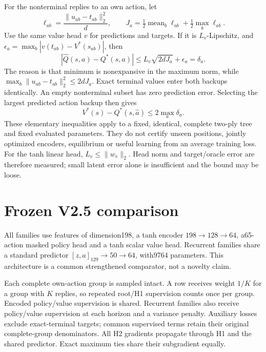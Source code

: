 \documentclass[11pt,a4paper]{article}
\begin{document}
For the nonterminal replies to an own action, let
\[
 \ell_{ab}=\frac{\|u_{ab}-t_{ab}\|_2^2}{d},\qquad
 J_a=\tfrac12\operatorname{mean}_b\ell_{ab}
       +\tfrac12\max_b\ell_{ab}.
\]
Use the same value head $v$ for predictions and targets. If it is
$L_v$-Lipschitz, and
$\epsilon_a=\max_b|v(t_{ab})-V^*(s_{ab})|$, then
\[
 |\widehat Q(s,a)-Q^*(s,a)|
 \le L_v\sqrt{2dJ_a}+\epsilon_a=\delta_a.
\]
The reason is that minimum is nonexpansive in the maximum norm, while
$\max_b\|u_{ab}-t_{ab}\|_2^2\le2dJ_a$. Exact terminal values enter both
backups identically. An empty nonterminal subset has zero prediction error.
Selecting the largest predicted action backup then gives
\[
 V^*(s)-Q^*(s,\widehat a)\le2\max_a\delta_a.
\]
These elementary inequalities apply to a fixed, identical, complete two-ply
tree and fixed evaluated parameters. They do not certify unseen positions,
jointly optimized encoders, equilibrium or useful learning from an average
training loss. For the tanh linear head, $L_v\le\|w_v\|_2$. Head norm and
target/oracle error are therefore measured; small latent error alone is
insufficient and the bound may be loose.

\section{Frozen V2.5 comparison}
All families use features of dimension198, a tanh encoder $198\to128\to64$,
a65-action masked policy head and a tanh scalar value head. Recurrent families
share a standard predictor $[z,a]_{129}\to50\to64$, with9764 parameters.
This architecture is a common strengthened comparator, not a novelty claim.

Each complete own-action group is sampled intact. A row receives weight $1/K$
for a group with $K$ replies, so repeated root/H1 supervision counts once per
group. Encoded policy/value supervision is shared. Recurrent families also
receive policy/value supervision at each horizon and a variance penalty.
Auxiliary losses exclude exact-terminal targets; common supervised terms retain
their original complete-group denominators. All H2 gradients propagate through
H1 and the shared predictor. Exact maximum ties share their subgradient equally.
\end{document}
